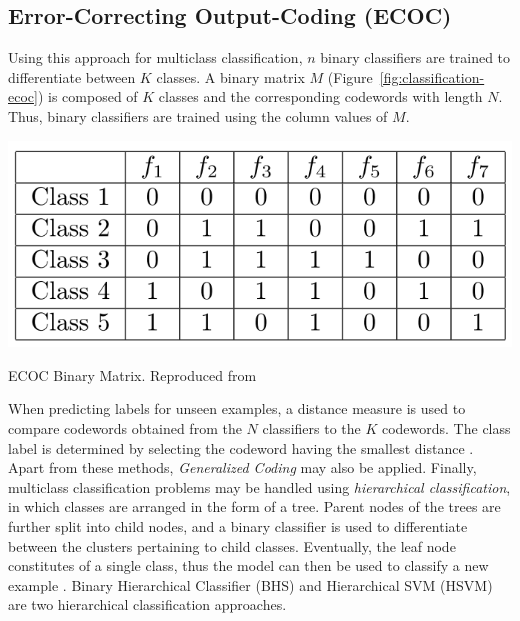 \subsection{Error-Correcting Output-Coding (ECOC)} 
Using this approach for multiclass classification, $n$ binary classifiers are trained to differentiate between $K$ classes. A binary matrix $M$ (Figure~\ref{fig:classification-ecoc}) is composed of $K$ classes and the corresponding codewords with length $N$. Thus, binary classifiers are trained using the column values of $M$.
\begin{marginfigure}
    \includegraphics{graphics/classification/ECOC.png}
    \caption{
    ECOC Binary Matrix. 
    Reproduced from \citep{aly2005}
    }
    \label{fig:classification-ecoc}
\end{marginfigure} 
When predicting labels for unseen examples, a distance measure is used to compare codewords obtained from the $N$ classifiers to the $K$ codewords. The class label is determined by selecting the codeword having the smallest distance \citep{aly2005}. \\


Apart from these methods, \textit{Generalized Coding} \citep{allwein2001} may also be applied. Finally, multiclass classification problems may be handled using \textit{hierarchical classification}, in which classes are arranged in the form of a tree. Parent nodes of the trees are further split into child nodes, and a binary classifier is used to differentiate between the clusters pertaining to child classes. Eventually, the leaf node constitutes of a single class, thus the model can then be used to classify a new example \citep{aly2005}. Binary Hierarchical Classifier (BHS) \citep{kumar2002} and Hierarchical SVM (HSVM) \citep{yangchi2014} are two hierarchical classification approaches. 

